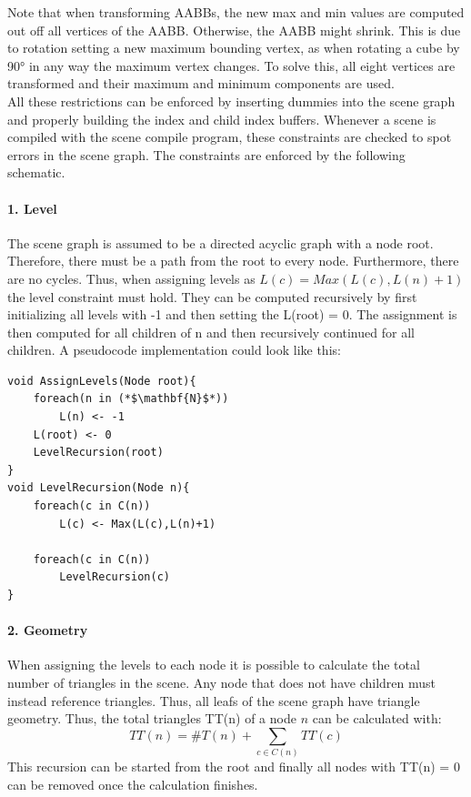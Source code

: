 Note that when transforming AABBs, the new max and min values are computed out off all vertices of the AABB. Otherwise, the AABB might shrink. This is due to rotation setting a new maximum bounding vertex, as when rotating a cube by 90° in any way the maximum vertex changes. To solve this, all eight vertices are transformed and their maximum and minimum components are used.\\
All these restrictions can be enforced by inserting dummies into the scene graph and properly building the index and child index buffers. Whenever a scene is compiled with the scene compile program, these constraints are checked to spot errors in the scene graph.
The constraints are enforced by the following schematic.
\paragraph{1. Level}
The scene graph is assumed to be a directed acyclic graph with a node root. Therefore, there must be a path from the root to every node. Furthermore, there are no cycles. Thus, when assigning levels as $L(c) = Max(L(c),L(n)+1)$ the level constraint must hold. They can be computed recursively by first initializing all levels with -1 and then setting the L(root) = 0. The assignment is then computed for all children of n and then recursively continued for all children. A pseudocode implementation could look like this:
\begin{lstlisting}
void AssignLevels(Node root){
    foreach(n in (*$\mathbf{N}$*))
        L(n) <- -1
    L(root) <- 0
    LevelRecursion(root)
}
void LevelRecursion(Node n){
    foreach(c in C(n))
        L(c) <- Max(L(c),L(n)+1)
        
    foreach(c in C(n))
        LevelRecursion(c)
}
\end{lstlisting}

\paragraph{2. Geometry}
When assigning the levels to each node it is possible to calculate the total number of triangles in the scene. Any node that does not have children must instead reference triangles. Thus, all leafs of the scene graph have triangle geometry. Thus, the total triangles TT(n) of a node $n$ can be calculated with:
\[TT(n) = \#T(n) + \sum_{c \in C(n)}TT(c)\]
This recursion can be started from the root and finally all nodes with TT(n) = 0 can be removed once the calculation finishes.
